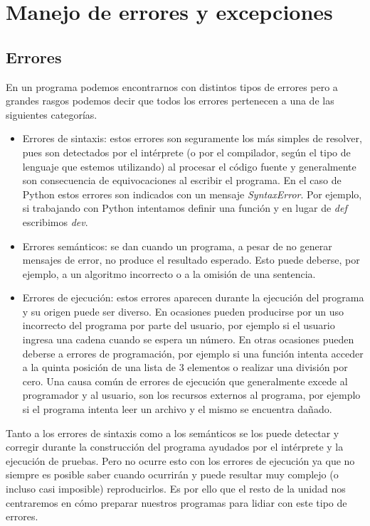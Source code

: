 \chapter{Manejo de errores y excepciones}

\section{Errores}

En un programa podemos encontrarnos con distintos tipos de errores pero a
grandes rasgos podemos decir que todos los errores pertenecen a una de las
siguientes categorías.

\begin{itemize}

\item Errores de sintaxis: estos errores son seguramente los más simples de
resolver, pues son detectados por el intérprete (o por el compilador, según el
tipo de lenguaje que estemos utilizando) al procesar el código fuente y
generalmente son consecuencia de equivocaciones al escribir el programa. En el
caso de Python estos errores son indicados con un mensaje {\it SyntaxError}.
Por ejemplo, si trabajando con Python intentamos definir una función y en
lugar de {\it def} escribimos {\it dev}.

\item Errores semánticos: se dan cuando un programa, a pesar de no generar
mensajes de error, no produce el resultado esperado. Esto puede deberse, por
ejemplo, a un algoritmo incorrecto o a la omisión de una sentencia.

\item Errores de ejecución: estos errores aparecen durante la ejecución del
programa y su origen puede ser diverso. En ocasiones pueden producirse por un
uso incorrecto del programa por parte del usuario, por ejemplo si el usuario
ingresa una cadena cuando se espera un número. En otras ocasiones pueden
deberse a errores de programación, por ejemplo si una función intenta acceder
a la quinta posición de una lista de 3 elementos o realizar una división por
cero. Una causa común de errores de ejecución que generalmente excede al
programador y al usuario, son los recursos externos al programa, por ejemplo
si el programa intenta leer un archivo y el mismo se encuentra dañado.

\end{itemize}

Tanto a los errores de sintaxis como a los semánticos se los puede detectar y
corregir durante la construcción del programa ayudados por el intérprete y
la ejecución de pruebas. Pero no ocurre esto con los errores de ejecución ya
que no siempre es posible saber cuando ocurrirán y puede resultar muy complejo
(o incluso casi imposible) reproducirlos. Es por ello que el resto de la
unidad nos centraremos en cómo preparar nuestros programas para lidiar con
este tipo de errores.

